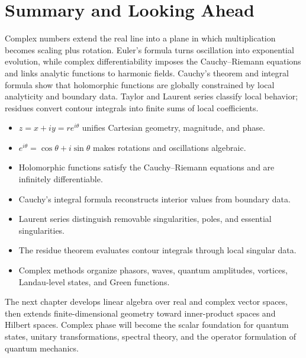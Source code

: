 \section{Summary and Looking Ahead}
\label{sec:ch5-summary}

Complex numbers extend the real line into a plane in which multiplication becomes scaling plus rotation. Euler's formula turns oscillation into exponential evolution, while complex differentiability imposes the Cauchy--Riemann equations and links analytic functions to harmonic fields. Cauchy's theorem and integral formula show that holomorphic functions are globally constrained by local analyticity and boundary data. Taylor and Laurent series classify local behavior; residues convert contour integrals into finite sums of local coefficients.

\begin{summarybox}
\begin{itemize}
\item $z=x+iy=re^{i\theta}$ unifies Cartesian geometry, magnitude, and phase.
\item $e^{i\theta}=\cos\theta+i\sin\theta$ makes rotations and oscillations algebraic.
\item Holomorphic functions satisfy the Cauchy--Riemann equations and are infinitely differentiable.
\item Cauchy's integral formula reconstructs interior values from boundary data.
\item Laurent series distinguish removable singularities, poles, and essential singularities.
\item The residue theorem evaluates contour integrals through local singular data.
\item Complex methods organize phasors, waves, quantum amplitudes, vortices, Landau-level states, and Green functions.
\end{itemize}
\end{summarybox}

The next chapter develops linear algebra over real and complex vector spaces, then extends finite-dimensional geometry toward inner-product spaces and Hilbert spaces. Complex phase will become the scalar foundation for quantum states, unitary transformations, spectral theory, and the operator formulation of quantum mechanics.
